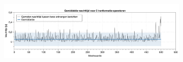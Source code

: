 \documentclass[twocolumn, a4paper]{article}
\begin{document}
\begin{figure}[htb]
\begin{subfigure}{0.88\textwidth}
    \end{subfigure}
    \begin{subfigure}{0.88\textwidth}
        \centering
        \includegraphics[width=\textwidth]{5_operator}        
    \end{subfigure}  
\end{figure}

\newpage

\end{document}

